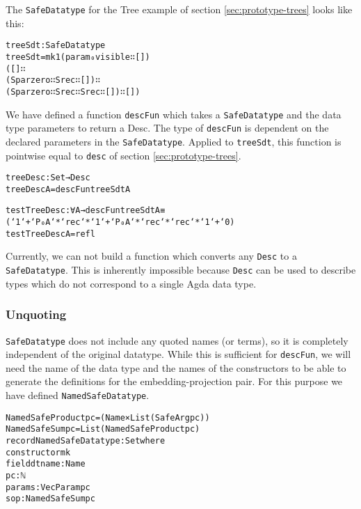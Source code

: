 The \texttt{SafeDatatype} for the Tree example of section
\ref{sec:prototype-trees} looks like this:

\begin{alltt}
treeSdt : SafeDatatype
treeSdt = mk 1 (param₀ visible ∷ [])
               ([] ∷
                (Spar zero ∷ Srec ∷ []) ∷
                (Spar zero ∷ Srec ∷ Srec ∷ []) ∷ [])
\end{alltt}

We have defined a function
\texttt{descFun} which takes a 
\texttt{SafeDatatype} and the data type parameters to return a Desc.
The type of \texttt{descFun} is dependent on the declared parameters
in the \texttt{SafeDatatype}.
Applied to \texttt{treeSdt}, this function is pointwise equal to
\texttt{desc} of section \ref{sec:prototype-trees}.

\begin{alltt}
treeDesc : Set → Desc
treeDesc A = descFun treeSdt A

testTreeDesc : ∀ A → descFun treeSdt A ≡
  (`1 `+ `P₀ A `* `rec `* `1 `+ `P₀ A `* `rec `* `rec `* `1 `+ `0)
testTreeDesc A = refl
\end{alltt}

Currently, we can not build a function which converts any
\texttt{Desc} to a \texttt{SafeDatatype}.
This is inherently impossible because \texttt{Desc} can be used to
describe types which do not correspond to a single Agda data type.

\subsubsection{Unquoting}\label{sec:prototype-unquoting}

\texttt{SafeDatatype} does not include any quoted names (or terms), so
it is completely independent of the original datatype.
While this is sufficient for \texttt{descFun}, we will need the name
of the data type and the names of the constructors to be able to
generate the definitions for the embedding-projection pair.
For this purpose we have defined \texttt{NamedSafeDatatype}.

\begin{alltt}
NamedSafeProduct {pc} = (Name × List (SafeArg {pc}))
NamedSafeSum {pc} = List (NamedSafeProduct {pc})
record NamedSafeDatatype : Set where
  constructor mk
  field dtname : Name
        pc : ℕ
        params : Vec Param pc
        sop : NamedSafeSum {pc}
\end{alltt}

